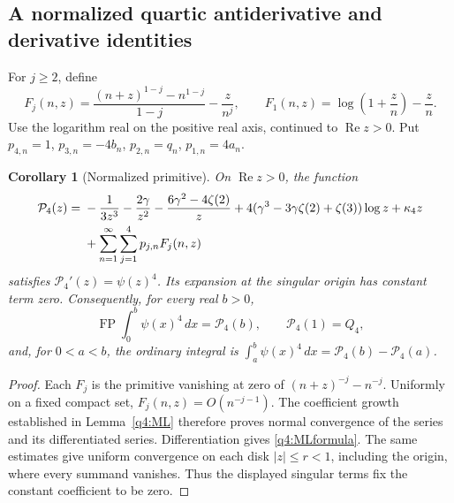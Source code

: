 \documentclass[11pt,a4paper]{article}
\numberwithin{equation}{section}
\newtheorem{corollary}[theorem]{Corollary}
\theoremstyle{definition}
\theoremstyle{remark}
\begin{document}
\subsection{A normalized quartic antiderivative and derivative identities}

For $j\geq2$, define
\[
 F_j(n,z)=\frac{(n+z)^{1-j}-n^{1-j}}{1-j}-\frac{z}{n^j},
 \qquad
 F_1(n,z)=\log\left(1+\frac zn\right)-\frac zn.
\]
Use the logarithm real on the positive real axis, continued to
$\operatorname{Re}z>0$.  Put
$p_{4,n}=1$, $p_{3,n}=-4b_n$, $p_{2,n}=q_n$, $p_{1,n}=4a_n$.

\begin{corollary}[Normalized primitive]\label{q4:primitive}
On $\operatorname{Re}z>0$, the function
\begin{align}\label{q4:primitiveformula}
 \mathcal P_4(z)={}&-\frac1{3z^3}-\frac{2\gamma}{z^2}
       -\frac{6\gamma^2-4\zeta(2)}z
       +4(\gamma^3-3\gamma\zeta(2)+\zeta(3))\log z
       +\kappa_4z\notag\\
 &+\sum_{n=1}^\infty\sum_{j=1}^4p_{j,n}F_j(n,z)
\end{align}
satisfies $\mathcal P_4'(z)=\psi(z)^4$.  Its expansion at the singular
origin has constant term zero.  Consequently, for every real $b>0$,
\[
 \operatorname{FP}\int_0^b\psi(x)^4\,dx=\mathcal P_4(b),
 \qquad \mathcal P_4(1)=Q_4,
\]
and, for $0<a<b$, the ordinary integral is
$\int_a^b\psi(x)^4\,dx=\mathcal P_4(b)-\mathcal P_4(a)$.
\end{corollary}

\begin{proof}
Each $F_j$ is the primitive vanishing at zero of
$(n+z)^{-j}-n^{-j}$.  Uniformly on a fixed compact set,
$F_j(n,z)=O(n^{-j-1})$.  The coefficient growth established in
Lemma~\ref{q4:ML} therefore proves normal convergence of the series and
its differentiated series.  Differentiation gives
\eqref{q4:MLformula}.  The same estimates give uniform convergence on
each disk $|z|\leq r<1$, including the origin, where every summand
vanishes.  Thus the displayed singular terms fix the constant
coefficient to be zero.
\end{proof}
\end{document}
